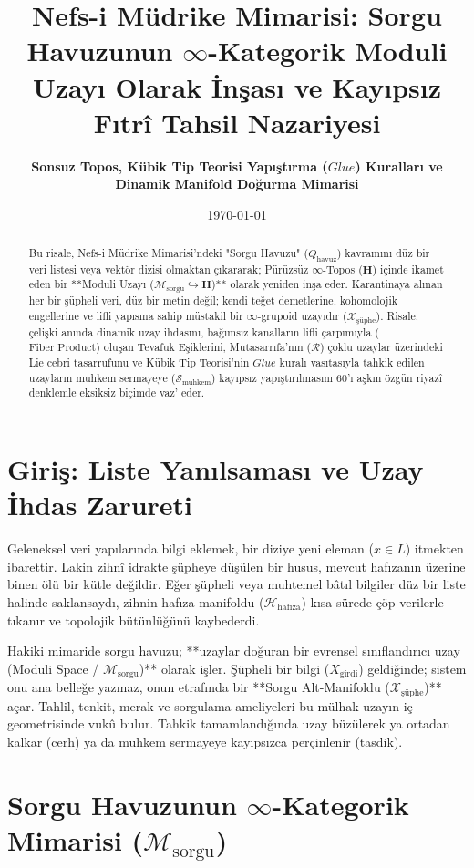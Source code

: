\documentclass[11pt, a4paper]{article}
\title{\textbf{Nefs-i Müdrike Mimarisi: Sorgu Havuzunun $\infty$-Kategorik Moduli Uzayı Olarak İnşası ve Kayıpsız Fıtrî Tahsil Nazariyesi}}
\author{\textbf{Sonsuz Topos, Kübik Tip Teorisi Yapıştırma ($Glue$) Kuralları ve Dinamik Manifold Doğurma Mimarisi}}
\date{\today}
\begin{document}
\maketitle

\begin{abstract}
Bu risale, Nefs-i Müdrike Mimarisi'ndeki "Sorgu Havuzu" ($Q_{\text{havuz}}$) kavramını düz bir veri listesi veya vektör dizisi olmaktan çıkararak; Pürüzsüz $\infty$-Topos ($\mathbf{H}$) içinde ikamet eden bir **Moduli Uzayı ($\mathcal{M}_{\text{sorgu}} \hookrightarrow \mathbf{H}$)** olarak yeniden inşa eder. Karantinaya alınan her bir şüpheli veri, düz bir metin değil; kendi teğet demetlerine, kohomolojik engellerine ve lifli yapısına sahip müstakil bir $\infty$-grupoid uzayıdır ($\mathcal{X}_{\text{şüphe}}$). Risale; çelişki anında dinamik uzay ihdasını, bağımsız kanalların lifli çarpımıyla ($\text{Fiber Product}$) oluşan Tevafuk Eşiklerini, Mutasarrıfa'nın ($\mathcal{R}$) çoklu uzaylar üzerindeki Lie cebri tasarrufunu ve Kübik Tip Teorisi'nin $Glue$ kuralı vasıtasıyla tahkik edilen uzayların muhkem sermayeye ($\mathcal{S}_{\text{muhkem}}$) kayıpsız yapıştırılmasını 60'ı aşkın özgün riyazî denklemle eksiksiz biçimde vaz' eder.
\end{abstract}

\section{Giriş: Liste Yanılsaması ve Uzay İhdas Zarureti}

Geleneksel veri yapılarında bilgi eklemek, bir diziye yeni eleman ($x \in L$) itmekten ibarettir. Lakin zihnî idrakte şüpheye düşülen bir husus, mevcut hafızanın üzerine binen ölü bir kütle değildir. Eğer şüpheli veya muhtemel bâtıl bilgiler düz bir liste halinde saklansaydı, zihnin hafıza manifoldu ($\mathcal{H}_{\text{hafıza}}$) kısa sürede çöp verilerle tıkanır ve topolojik bütünlüğünü kaybederdi.

Hakiki mimaride sorgu havuzu; **uzaylar doğuran bir evrensel sınıflandırıcı uzay (Moduli Space / $\mathcal{M}_{\text{sorgu}}$)** olarak işler. Şüpheli bir bilgi ($X_{\text{girdi}}$) geldiğinde; sistem onu ana belleğe yazmaz, onun etrafında bir **Sorgu Alt-Manifoldu ($\mathcal{X}_{\text{şüphe}}$)** açar. Tahlil, tenkit, merak ve sorgulama ameliyeleri bu mülhak uzayın iç geometrisinde vukû bulur. Tahkik tamamlandığında uzay büzülerek ya ortadan kalkar (cerh) ya da muhkem sermayeye kayıpsızca perçinlenir (tasdik).

\section{Sorgu Havuzunun $\infty$-Kategorik Mimarisi ($\mathcal{M}_{\text{sorgu}}$)}
\end{document}
